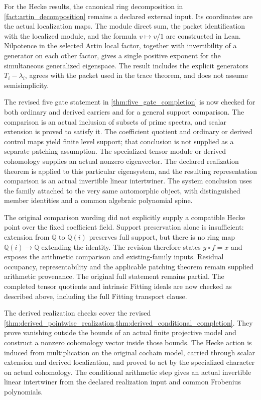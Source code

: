 \documentclass[11pt]{amsart}
\theoremstyle{definition}
\theoremstyle{remark}
\begin{document}
For the Hecke results, the canonical ring decomposition in \cref{fact:artin_decomposition} remains a declared external input. Its coordinates are the actual localization maps. The module direct sum, the packet identification with the localized module, and the formula \(v\mapsto v/1\) are constructed in Lean. Nilpotence in the selected Artin local factor, together with invertibility of a generator on each other factor, gives a single positive exponent for the simultaneous generalized eigenspace. The result includes the explicit generators \(T_i-\lambda_i\), agrees with the packet used in the trace theorem, and does not assume semisimplicity.

The revised five gate statement in \cref{thm:five_gate_completion} is now checked for both ordinary and derived carriers and for a general support comparison. The comparison is an actual inclusion of subsets of prime spectra, and scalar extension is proved to satisfy it. The coefficient quotient and ordinary or derived control maps yield finite level support; that conclusion is not supplied as a separate patching assumption. The specialized tensor module or derived cohomology supplies an actual nonzero eigenvector. The declared realization theorem is applied to this particular eigensystem, and the resulting representation comparison is an actual invertible linear intertwiner. The system conclusion uses the family attached to the very same automorphic object, with distinguished member identities and a common algebraic polynomial spine.

The original comparison wording did not explicitly supply a compatible Hecke point over the fixed coefficient field. Support preservation alone is insufficient: extension from \(\mathbb Q\) to \(\mathbb Q(i)\) preserves full support, but there is no ring map \(\mathbb Q(i)\to\mathbb Q\) extending the identity. The revision therefore states \(y\circ f=x\) and exposes the arithmetic comparison and existing-family inputs. Residual occupancy, representability and the applicable patching theorem remain supplied arithmetic provenance. The original full statement remains partial. The completed tensor quotients and intrinsic Fitting ideals are now checked as described above, including the full Fitting transport clause.

The derived realization checks cover the revised \cref{thm:derived_pointwise_realization,thm:derived_conditional_completion}. They prove vanishing outside the bounds of an actual finite projective model and construct a nonzero cohomology vector inside those bounds. The Hecke action is induced from multiplication on the original cochain model, carried through scalar extension and derived localization, and proved to act by the specialized character on actual cohomology. The conditional arithmetic step gives an actual invertible linear intertwiner from the declared realization input and common Frobenius polynomials.
\end{document}
